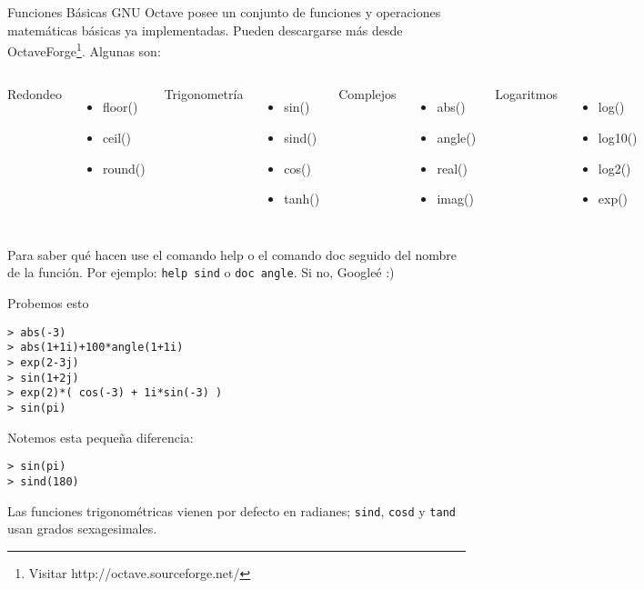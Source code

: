 \begin{frame}[fragile]{Funciones Básicas}
  GNU Octave posee un conjunto de funciones y operaciones matemáticas básicas ya implementadas. Pueden descargarse más desde OctaveForge\footnote{Visitar {http://octave.sourceforge.net/}}. Algunas son:
  
    \begin{columns}[T,onlytextwidth]
      Redondeo
      \begin{itemize}
        \item floor() \item ceil() \item round()
      \end{itemize}

      Trigonometría
      \begin{itemize}
        \item sin() \item sind() \item cos() \item tanh()
      \end{itemize}

      Complejos
      \begin{itemize}
        \item abs() \item angle() \item real() \item imag()
      \end{itemize}
      Logaritmos
      \begin{itemize}
        \item log() \item log10() \item log2() \item exp()
      \end{itemize}
  \end{columns}

  Para saber qué hacen use el comando help o el comando doc seguido del nombre de la función. Por ejemplo: \verb!help sind! o \verb!doc angle!. Si no, Googleé :)

\end{frame}

\begin{frame}[fragile]{Probemos esto} %
\begin{lstlisting}
> abs(-3)
> abs(1+1i)+100*angle(1+1i)
> exp(2-3j)
> sin(1+2j)
> exp(2)*( cos(-3) + 1i*sin(-3) )
> sin(pi)
\end{lstlisting}
	Notemos esta pequeña diferencia:
\begin{lstlisting}
> sin(pi)
> sind(180)
\end{lstlisting}
	Las funciones trigonométricas vienen por defecto en radianes; \verb!sind!, \verb!cosd! y \verb!tand! usan grados sexagesimales.

\end{frame}

